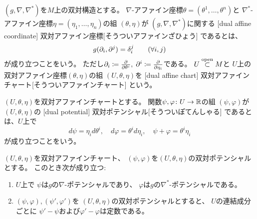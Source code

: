 \documentclass[report]{jlreq}
\begin{document}
\begin{definition}[双対アファイン座標]
    $(g, \nabla, \nabla^*)$を$M$上の双対構造とする。
    $\nabla$-アファイン座標$\theta = (\theta^1, \ldots, \theta^n)$と
    $\nabla^*$-アファイン座標$\eta = (\eta_1, \ldots, \eta_n)$の組
    $(\theta, \eta)$が
    $(g, \nabla, \nabla^*)$に関する
    [dual affine coordinate]
        {双対アファイン座標}[そうついアファインざひょう]
    であるとは、
    \begin{equation}
        g(\partial_i, \partial^j) = \delta_i^j
            \qquad
            (\forall i, j)
    \end{equation}
    が成り立つことをいう。
    ただし$\del_i \coloneqq \deldel{\theta^i}, \;
        \del^i \coloneqq \deldel{\eta_i}$である。
    $U \stackrel{\text{open}}{\subset} M$と
    $U$上の双対アファイン座標$(\theta, \eta)$の組
    $(U, \theta, \eta)$を
    [dual affine chart]
        {双対アファインチャート}[そうついアファインチャート]
    という。
\end{definition}

\begin{definition}[双対ポテンシャル]
    $(U, \theta, \eta)$を双対アファインチャートとする。
    関数$\psi, \varphi \colon U \to \mathbb{R}$の組
    $(\psi, \varphi)$が$(U, \theta, \eta)$の
    [dual potential]
        {双対ポテンシャル}[そうついぽてんしゃる]
    であるとは、$U$上で
    \begin{equation}
        d\psi = \eta_i d\theta^i,
            \quad
            d\varphi = \theta^i d\eta_i,
            \quad
            \psi + \varphi = \theta^i \eta_i
    \end{equation}
    が成り立つことをいう。
\end{definition}

\begin{proposition}[双対ポテンシャルの基本性質]
    $(U, \theta, \eta)$を双対アファインチャート、
    $(\psi, \varphi)$を$(U, \theta, \eta)$の双対ポテンシャルとする。
    このとき次が成り立つ:
    \begin{enumerate}
        \item $U$上で
            $\psi$は$g$の$\nabla$-ポテンシャルであり、
            $\varphi$は$g$の$\nabla^*$-ポテンシャルである。
        \item $(\psi, \varphi), (\psi', \varphi')$を
            $(U, \theta, \eta)$の双対ポテンシャルとすると、
            $U$の連結成分ごとに
            $\psi' - \psi$および$\varphi' - \varphi$は定数である。
    \end{enumerate}
\end{proposition}
\end{document}
